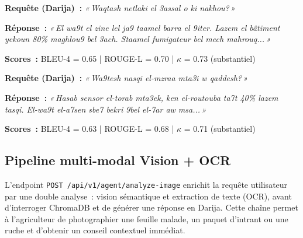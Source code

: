 \vspace{0.5em}

\begin{tcolorbox}[colback=blue!5, colframe=blue!50!black,
  title={\textbf{Exemple 2 --- Conseil nutrition ruche}},
  fonttitle=\small\bfseries, boxrule=0.8pt]
\textbf{Requête (Darija)~:} \textit{«\,Waqtash netlaki el 3assal o ki nakhou?\,»}

\textbf{Réponse~:} \textit{«\,El wa9t el zine lel ja9 taamel barra el 9iter. Lazem el bâtiment
yekoun 80\% maghlou9 bel 3ach. Staamel fumigateur bel mech mahrouq...\,»}

\textbf{Scores~:} BLEU-4 = 0.65 | ROUGE-L = 0.70 | $\kappa$ = 0.73 (substantiel)
\end{tcolorbox}

\vspace{0.5em}

\begin{tcolorbox}[colback=olive!5, colframe=olive!50!black,
  title={\textbf{Exemple 3 --- Conseil irrigation}},
  fonttitle=\small\bfseries, boxrule=0.8pt]
\textbf{Requête (Darija)~:} \textit{«\,Wa9tesh nasqi el-mzraa mta3i w qaddesh?\,»}

\textbf{Réponse~:} \textit{«\,Hasab sensor el-torab mta3ek, ken el-routouba ta7t 40\%
lazem tasqi. El-wa9t el-a7sen sbe7 bekri 9bel el-7ar aw msa...\,»}

\textbf{Scores~:} BLEU-4 = 0.63 | ROUGE-L = 0.68 | $\kappa$ = 0.71 (substantiel)
\end{tcolorbox}

\subsection{Pipeline multi-modal Vision + OCR}
\label{subsec:multimodal_pipeline}

L'endpoint \texttt{POST /api/v1/agent/analyze-image} enrichit la requête utilisateur
par une double analyse~: vision sémantique et extraction de texte (OCR), avant
d'interroger ChromaDB et de générer une réponse en Darija. Cette chaîne permet à
l'agriculteur de photographier une feuille malade, un paquet d'intrant ou une ruche
et d'obtenir un conseil contextuel immédiat.

